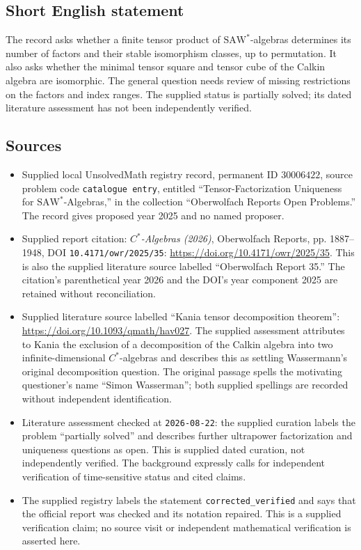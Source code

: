 \documentclass[11pt]{article}
\begin{document}
\subsection{Short English statement}
The record asks whether a finite tensor product of \(\mathrm{SAW}^*\)-algebras determines its number of factors and their stable isomorphism classes, up to permutation. It also asks whether the minimal tensor square and tensor cube of the Calkin algebra are isomorphic. The general question needs review of missing restrictions on the factors and index ranges. The supplied status is partially solved; its dated literature assessment has not been independently verified.
\subsection{Sources}
\begin{itemize}
\item Supplied local UnsolvedMath registry record, permanent ID \(30006422\), source problem code \texttt{catalogue entry}, entitled ``Tensor-Factorization Uniqueness for \(\mathrm{SAW}^*\)-Algebras,'' in the collection ``Oberwolfach Reports Open Problems.'' The record gives proposed year 2025 and no named proposer.
\item Supplied report citation: \emph{\(C^*\)-Algebras (2026)}, Oberwolfach Reports, pp. 1887--1948, DOI \texttt{10.4171/owr/2025/35}: \url{https://doi.org/10.4171/owr/2025/35}. This is also the supplied literature source labelled ``Oberwolfach Report 35.'' The citation's parenthetical year 2026 and the DOI's year component 2025 are retained without reconciliation.
\item Supplied literature source labelled ``Kania tensor decomposition theorem'': \url{https://doi.org/10.1093/qmath/hav027}. The supplied assessment attributes to Kania the exclusion of a decomposition of the Calkin algebra into two infinite-dimensional \(C^*\)-algebras and describes this as settling Wassermann's original decomposition question. The original passage spells the motivating questioner's name ``Simon Wasserman''; both supplied spellings are recorded without independent identification.
\item Literature assessment checked at \texttt{2026-08-22}: the supplied curation labels the problem ``partially solved'' and describes further ultrapower factorization and uniqueness questions as open. This is supplied dated curation, not independently verified. The background expressly calls for independent verification of time-sensitive status and cited claims.
\item The supplied registry labels the statement \texttt{corrected\_verified} and says that the official report was checked and its notation repaired. This is a supplied verification claim; no source visit or independent mathematical verification is asserted here.
\end{itemize}
\end{document}
